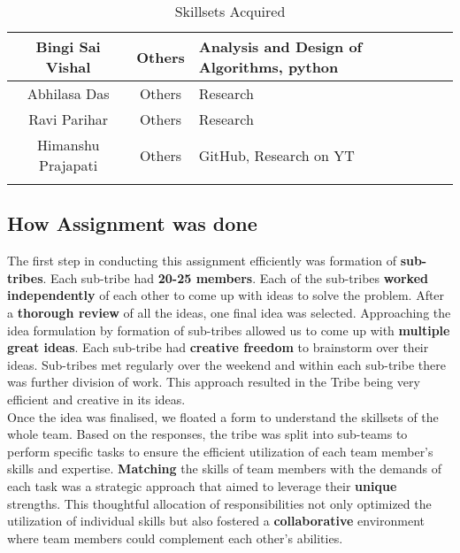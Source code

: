 \begin{center}
\begin{longtable}{ | c | c | m{6cm} | }
        \hline
        Bingi Sai Vishal           & Others            & Analysis and Design of Algorithms, python                               \\
        \hline
        Abhilasa Das               & Others            & Research                                                                \\
        \hline
        Ravi Parihar               & Others            & Research                                                                \\
        \hline
        Himanshu Prajapati         & Others            & GitHub, Research on YT                                                  \\
        \hline


        \hline
        \caption{Skillsets Acquired}
    \end{longtable}
\end{center}

\subsection{How Assignment was done}


The first step in conducting this assignment efficiently was formation of \textbf{sub-tribes}. Each sub-tribe had \textbf{20-25 members}. Each of the sub-tribes \textbf{worked independently} of each other to come up with ideas to solve the problem. After a \textbf{thorough review} of all the ideas, one final idea was selected. Approaching the idea formulation by formation of sub-tribes allowed us to come up with \textbf{multiple great ideas}. Each sub-tribe had \textbf{creative freedom} to brainstorm over their ideas. Sub-tribes met regularly over the weekend and within each sub-tribe there was further division of work. This approach resulted in the Tribe being very efficient and creative in its ideas.
\\

Once the idea was finalised, we floated a form to understand the skillsets of the whole team. Based on the responses, the tribe was split into sub-teams to perform specific tasks to ensure the efficient utilization of each team member's skills and expertise. \textbf{Matching} the skills of team members with the demands of each task was a strategic approach that aimed to leverage their \textbf{unique} strengths. This thoughtful allocation of responsibilities not only optimized the utilization of individual skills but also fostered a \textbf{collaborative} environment where team members could complement each other's abilities.
\\

